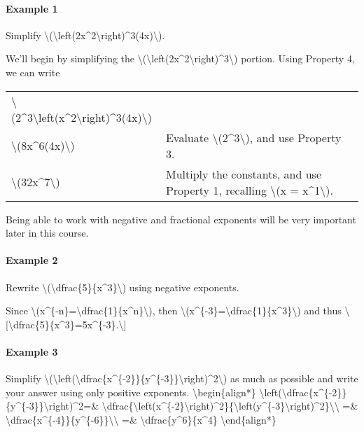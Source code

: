 \hypertarget{example-1}{%
\paragraph{Example 1}\label{example-1}}

Simplify
\textbackslash{}(\textbackslash{}left(2x\^{}2\textbackslash{}right)\^{}3(4x)\textbackslash{}).

We'll begin by simplifying the
\textbackslash{}(\textbackslash{}left(2x\^{}2\textbackslash{}right)\^{}3\textbackslash{})
portion. Using Property 4, we can write

\begin{longtable}[]{@{}ll@{}}
\toprule
\endhead
\textbackslash{}(2\^{}3\textbackslash{}left(x\^{}2\textbackslash{}right)\^{}3(4x)\textbackslash{})
&\tabularnewline
\textbackslash{}(8x\^{}6(4x)\textbackslash{}) & Evaluate
\textbackslash{}(2\^{}3\textbackslash{}), and use Property
3.\tabularnewline
\textbackslash{}(32x\^{}7\textbackslash{}) & Multiply the constants, and
use Property 1, recalling \textbackslash{}(x =
x\^{}1\textbackslash{}).\tabularnewline
\bottomrule
\end{longtable}

Being able to work with negative and fractional exponents will be very
important later in this course.

\hypertarget{example-2}{%
\paragraph{Example 2}\label{example-2}}

Rewrite
\textbackslash{}(\textbackslash{}dfrac\{5\}\{x\^{}3\}\textbackslash{})
using negative exponents.

Since
\textbackslash{}(x\^{}\{-n\}=\textbackslash{}dfrac\{1\}\{x\^{}n\}\textbackslash{}),
then
\textbackslash{}(x\^{}\{-3\}=\textbackslash{}dfrac\{1\}\{x\^{}3\}\textbackslash{})
and thus
\textbackslash{}{[}\textbackslash{}dfrac\{5\}\{x\^{}3\}=5x\^{}\{-3\}.\textbackslash{}{]}

\hypertarget{example-3}{%
\paragraph{Example 3}\label{example-3}}

Simplify
\textbackslash{}(\textbackslash{}left(\textbackslash{}dfrac\{x\^{}\{-2\}\}\{y\^{}\{-3\}\}\textbackslash{}right)\^{}2\textbackslash{})
as much as possible and write your answer using only positive exponents.
\textbackslash{}begin\{align*\}
\textbackslash{}left(\textbackslash{}dfrac\{x\^{}\{-2\}\}\{y\^{}\{-3\}\}\textbackslash{}right)\^{}2=\&
\textbackslash{}dfrac\{\textbackslash{}left(x\^{}\{-2\}\textbackslash{}right)\^{}2\}\{\textbackslash{}left(y\^{}\{-3\}\textbackslash{}right)\^{}2\}\textbackslash{}\textbackslash{}
=\&
\textbackslash{}dfrac\{x\^{}\{-4\}\}\{y\^{}\{-6\}\}\textbackslash{}\textbackslash{}
=\& \textbackslash{}dfrac\{y\^{}6\}\{x\^{}4\}
\textbackslash{}end\{align*\}

